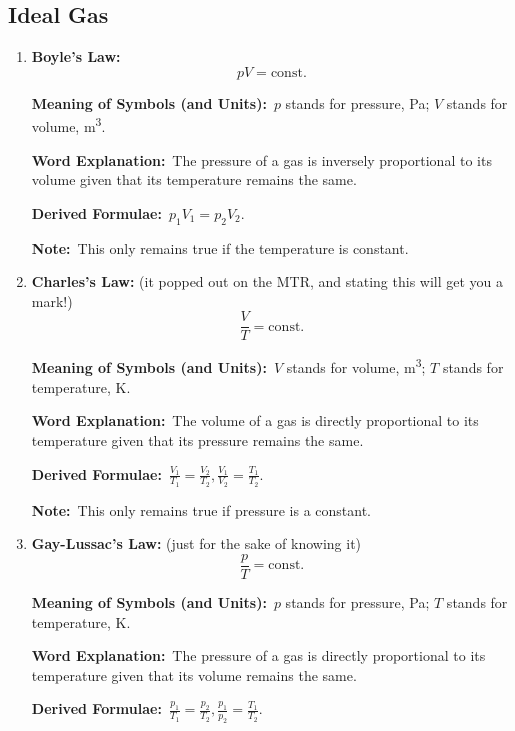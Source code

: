 \documentclass[8pt]{article}
\newcommand{\MeanSymb}{\textbf{Meaning of Symbols (and Units):}\ }
\newcommand{\WordExpl}{\textbf{Word Explanation:}\ }
\newcommand{\DeriForm}{\textbf{Derived Formulae:}\ }
\newcommand{\Note}{\textbf{Note:}\ }
\begin{document}
        \subsection{Ideal Gas}
            \begin{enumerate}
                \item \textbf{Boyle's Law:}
                \[
                    pV = \mathrm{const.}
                \]

                \MeanSymb \(p\) stands for pressure, \unit{\pascal}; \(V\) stands for volume, \unit{\metre \cubed}.

                \WordExpl The pressure of a gas is inversely proportional to its volume given that its temperature remains the same.

                \DeriForm \(p_1 V_1 = p_2 V_2\).

                \Note This only remains true if the temperature is constant.
                
                \item \textbf{Charles's Law:} (it popped out on the MTR, and stating this will get you a mark!)
                \[
                    \frac{V}{T} = \mathrm{const.}
                \]

                \MeanSymb \(V\) stands for volume, \unit{\metre \cubed}; \(T\) stands for temperature, \unit{\kelvin}.

                \WordExpl The volume of a gas is directly proportional to its temperature given that its pressure remains the same.

                \DeriForm \(\frac{V_1}{T_1} = \frac{V_2}{T_2}, \frac{V_1}{V_2} = \frac{T_1}{T_2}\).

                \Note This only remains true if pressure is a constant.
                
                \item \textbf{Gay-Lussac's Law:} (just for the sake of knowing it)
                \[
                    \frac{p}{T} = \mathrm{const.}
                \]

                \MeanSymb \(p\) stands for pressure, \unit{\pascal}; \(T\) stands for temperature, \unit{\kelvin}.

                \WordExpl The pressure of a gas is directly proportional to its temperature given that its volume remains the same.

                \DeriForm \(\frac{p_1}{T_1} = \frac{p_2}{T_2}, \frac{p_1}{p_2} = \frac{T_1}{T_2}\).


\end{enumerate}
\end{document}
